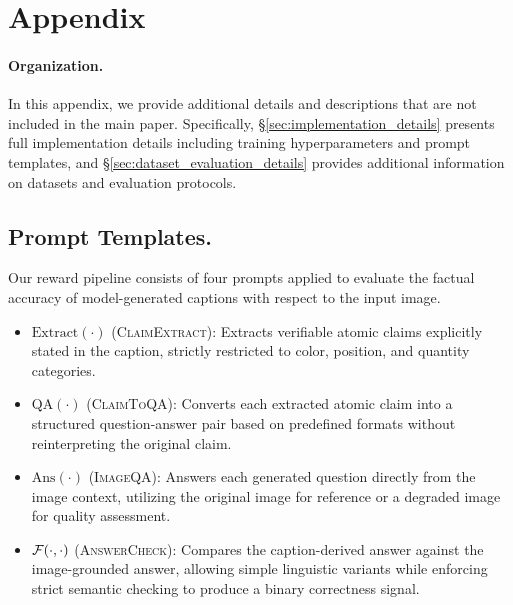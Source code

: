\section{Appendix}
\label{sec:appendix}

\paragraph{Organization.}
In this appendix, we provide additional details and descriptions that are not included in the main paper.
Specifically, \S\ref{sec:implementation_details} presents full implementation details including training hyperparameters and prompt templates, and \S\ref{sec:dataset_evaluation_details} provides additional information on datasets and evaluation protocols.

\subsection{Prompt Templates.}
\label{para:prompt_templates}

Our reward pipeline consists of four prompts applied to evaluate the factual accuracy of model-generated captions with respect to the input image.
\begin{itemize}
    \item $\text{Extract}(\cdot)$ (\textsc{ClaimExtract}): Extracts verifiable atomic claims explicitly stated in the caption, strictly restricted to color, position, and quantity categories.
    \item $\text{QA}(\cdot)$ (\textsc{ClaimToQA}): Converts each extracted atomic claim into a structured question-answer pair based on predefined formats without reinterpreting the original claim.
    \item $\text{Ans}(\cdot)$ (\textsc{ImageQA}): Answers each generated question directly from the image context, utilizing the original image for reference or a degraded image for quality assessment.
    \item ${\mathcal{F}}(\cdot, \cdot)$ (\textsc{AnswerCheck}): Compares the caption-derived answer against the image-grounded answer, allowing simple linguistic variants while enforcing strict semantic checking to produce a binary correctness signal.
\end{itemize}

